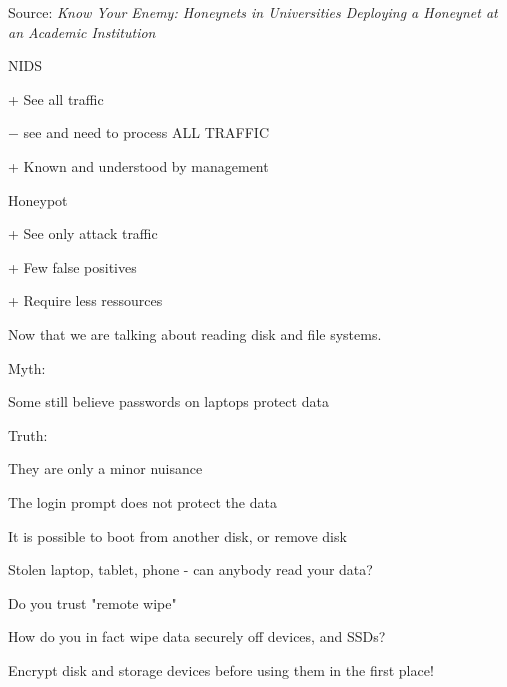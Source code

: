 \documentclass[Screen16to9,17pt]{foils}
\begin{document}
Source: \emph{Know Your Enemy: Honeynets in Universities Deploying a Honeynet at an Academic Institution}


\begin{list1}
\item NIDS
\begin{list2}
\item + See all traffic
\item $-$ see and need to process ALL TRAFFIC
\item + Known and understood by management
\end{list2}
\item Honeypot
\begin{list2}
\item + See only attack traffic
\item + Few false positives
\item + Require less ressources
\end{list2}
\end{list1}




Now that we are talking about reading disk and file systems.

\begin{list1}
\item Myth:
\item Some still believe passwords on laptops protect data
\item Truth:
\item They are only a minor nuisance
\item The login prompt does not protect the data
\item It is possible to boot from another disk, or remove disk
\end{list1}




\begin{list1}
\item Stolen laptop, tablet, phone - can anybody read your data?
\item Do you trust "remote wipe"
\item How do you in fact wipe data securely off devices, and SSDs?
\item Encrypt disk and storage devices before using them in the first place!
\end{list1}
\end{document}
